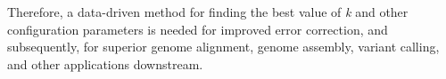 Therefore, a data-driven  method for finding the best value of \textit{k} and other configuration parameters is needed for improved error correction, and subsequently, for superior genome alignment, genome assembly, variant calling, and other applications downstream.


